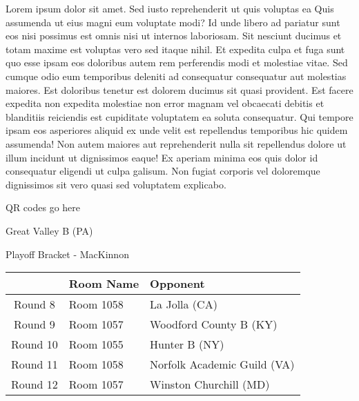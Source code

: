 \documentclass{article}%
\begin{document}
\vspace*{8pt}%
\linebreak%
\newline%
\newline%
Lorem ipsum dolor sit amet. Sed iusto reprehenderit ut quis voluptas ea Quis assumenda ut eius magni eum voluptate modi? Id unde libero ad pariatur sunt eos nisi possimus est omnis nisi ut internos laboriosam. Sit nesciunt ducimus et totam maxime est voluptas vero sed itaque nihil. Et expedita culpa et fuga sunt quo esse ipsam eos doloribus autem rem perferendis modi et molestiae vitae.\newline%
\newline%
Sed cumque odio eum temporibus deleniti ad consequatur consequatur aut molestias maiores. Est doloribus tenetur est dolorem ducimus sit quasi provident. Est facere expedita non expedita molestiae non error magnam vel obcaecati debitis et blanditiis reiciendis est cupiditate voluptatem ea soluta consequatur. Qui tempore ipsam eos asperiores aliquid ex unde velit est repellendus temporibus hic quidem assumenda!\newline%
\newline%
Non autem maiores aut reprehenderit nulla sit repellendus dolore ut illum incidunt ut dignissimos eaque! Ex aperiam minima eos quis dolor id consequatur eligendi ut culpa galisum. Non fugiat corporis vel doloremque dignissimos sit vero quasi sed voluptatem explicabo.\newline%
\newline%
%
\vspace*{30pt}%
\begin{center}%
\begin{Huge}%
QR codes go here%
\end{Huge}%
\end{center}%
\newpage%
\begin{center}%
\begin{Huge}%
Great Valley B (PA)%
\end{Huge}%
\vspace*{8pt}%
\linebreak%
\begin{Large}%
Playoff Bracket {-} MacKinnon%
\end{Large}%
\end{center}%
%
\begin{tabularx}{\textwidth}{|c|Y|Y|}%
\hline%
&Room Name&Opponent\\%
\hline%
Round 8&Room 1058&La Jolla (CA)\\%
Round 9&Room 1057&Woodford County B (KY)\\%
Round 10&Room 1055&Hunter B (NY)\\%
Round 11&Room 1058&Norfolk Academic Guild (VA)\\%
Round 12&Room 1057&Winston Churchill (MD)\\%
\hline%
\end{tabularx}%
\end{document}
